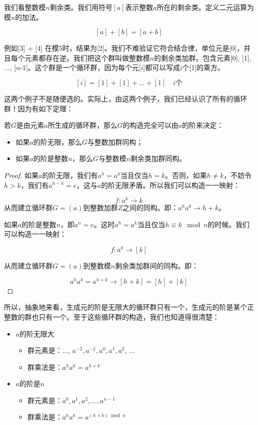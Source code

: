 \documentclass{article}
\begin{document}
\begin{example}
我们看整数模$n$剩余类。我们用符号$[a]$表示整数$a$所在的剩余类。定义二元运算为模$n$的加法。

\[
[a] + [b] = [a + b]
\]

例如[3] + [4] 在模5时，结果为[2]。我们不难验证它符合结合律，单位元是[0]，并且每个元素都存在逆。我们把这个群叫做整数模$n$的剩余类加群。包含元素[0], [1], ..., [$n$-1]。这个群是一个循环群，因为每个元[$i$]都可以写成$i$个[1]的乘方。

\[
[i] = [1] + [1] + ... + [1] \quad \text{$i$个}
\]
\end{example}

这两个例子不是随便选的。实际上，由这两个例子，我们已经认识了所有的循环群！因为有如下定理：

\begin{theorem}
若$G$是由元素$a$所生成的循环群，那么$G$的构造完全可以由$a$的阶来决定：
\begin{itemize}
\item 如果$a$的阶无限，那么$G$与整数加群同构；
\item 如果$a$的阶是整数$n$，那么$G$与整数模$n$剩余类加群同构。
\end{itemize}
\end{theorem}

\begin{proof}
如果$a$的阶无限，我们有$a^h = a^k$当且仅当$h = k$。否则，如果$h \neq k$，不妨令$h > k$，我们有$a^{h - k} = e$，这与$a$的阶无限矛盾。所以我们可以构造一一映射：

\[
f: a^k \to k
\]
从而建立循环群$G=(a)$到整数加群$Z$之间的同构。即：$a^ha^k \to h + k$。

如果$a$的阶是整数$n$，即$a^n = e$。这时$a^h = a^k$当且仅当$h \equiv k \mod n$的时候。我们可以构造一一映射：

\[
f: a^k \to [k]
\]

从而建立循环群$G = (a)$到整数模$n$剩余类加群间的同构。即：

\[
a^ha^k = a^{h + k} \to [h + k] = [h] + [k]
\]
\end{proof}

所以，抽象地来看，生成元的阶是无限大的循环群只有一个，生成元的阶是某个正整数的群也只有一个。至于这些循环群的构造，我们也知道得很清楚：

\begin{itemize}
\item $a$的阶无限大
  \begin{itemize}
  \item 群元素是：..., $a^{-2}, a^{-1}, a^0, a^1, a^2$, ...
  \item 群乘法是：$a^ha^k = a^{h + k}$
  \end{itemize}
\item $a$的阶是$n$
  \begin{itemize}
  \item 群元素是：$a^0, a^1, a^2, ..., a^{n-1}$
  \item 群乘法是：$a^ha^k = a^{(h + k) \bmod n}$
  \end{itemize}
\end{itemize}
\end{document}
